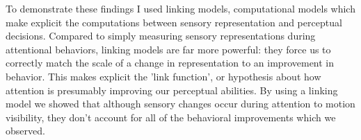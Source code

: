 \documentclass{report}
\begin{document}
To demonstrate these findings I used linking models, computational models which make explicit the computations between sensory representation and perceptual decisions. Compared to simply measuring sensory representations during attentional behaviors, linking models are far more powerful: they force us to correctly match the scale of a change in representation to an improvement in behavior. This makes explicit the 'link function', or hypothesis about how attention is presumably improving our perceptual abilities. By using a linking model we showed that although sensory changes occur during attention to motion visibility, they don't account for all of the behavioral improvements which we observed. 





\printbibliography
\end{document}
